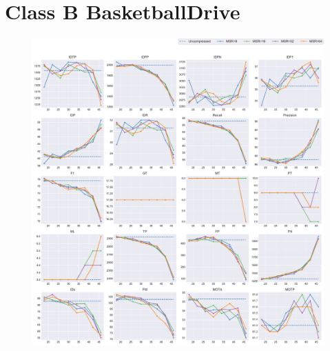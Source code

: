 
\section{Class B BasketballDrive}
\label{sec:appendix/BasketballDrive_all}


\begin{figure}[!htbp]
\centering
\includegraphics[width=1.0\linewidth]{img/appendix/BasketballDrive_all_multiplots_qp.pdf}
\caption[Result of all object classes in Class B BasketballDrive with Horizontal Axis of QP]{}
\label{fig:BasketballDrive_all_qp}
\end{figure}

